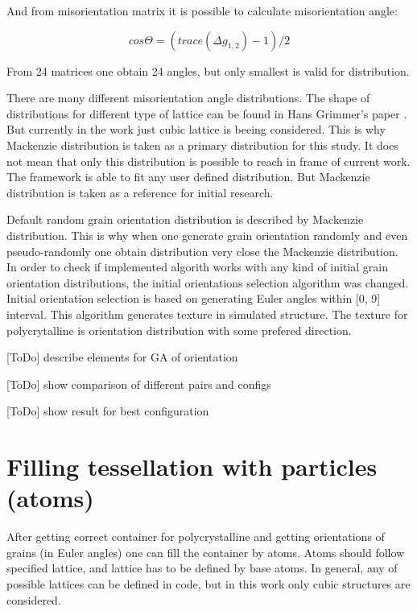 \documentclass[12pt]{report}
\begin{document}
And from misorientation matrix it is possible to calculate misorientation angle:

\begin{equation} \label{misangle}
cos\Theta = (trace(\Delta g_{1,2}) - 1)/2
\end{equation}
\bigbreak

From 24 matrices one obtain 24 angles, but only smallest is valid for distribution.

There are many different misorientation angle distributions. The shape of distributions for different type of lattice can be found in Hans Grimmer's paper \cite{hans79}. But currently in the work just cubic lattice is beeing considered. This is why Mackenzie distribution \cite{mack58} is taken as a primary distribution for this study. It does not mean that only this distribution is possible to reach in frame of current work. The framework is able to fit any user defined distribution. But Mackenzie distribution is taken as a reference for initial research. 

Default random grain orientation distribution is described by Mackenzie distribution. This is why when one generate grain orientation randomly and even pseudo-randomly one obtain distribution very close the Mackenzie distribution. In order to check if implemented algorith works with any kind of initial grain orientation distributions, the initial orientations selection algorithm was changed. Initial orientation selection is based on generating Euler angles within [0\degree, 9\degree] interval. This algorithm generates texture in simulated structure. The texture for polycrytalline is orientation distribution with some prefered direction.

[ToDo] describe elements for GA of orientation

[ToDo] show comparison of different pairs and configs

[ToDo] show result for best configuration


\section{Filling tessellation with particles (atoms)}

After getting correct container for polycrystalline and getting orientations of grains (in Euler angles) one can fill the container by atoms. Atoms should follow specified lattice, and lattice has to be defined by base atoms. In general, any of possible lattices can be defined in code, but in this work only cubic structures are considered.
\end{document}
